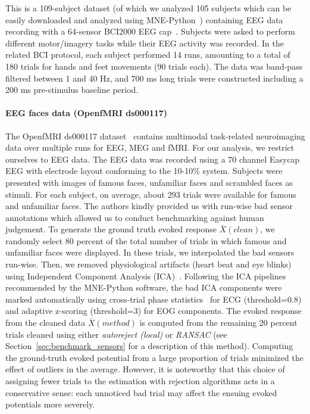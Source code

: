 This is a 109-subject dataset (of which we analyzed 105 subjects which can be easily downloaded and analyzed using MNE-Python~\citep{gramfort2013meg}) containing EEG data recording with a 64-sensor BCI2000 EEG cap~\citep{schalk2004bci2000}. Subjects were asked to perform different motor/imagery tasks while their EEG activity was recorded. In the related BCI protocol, each subject performed 14 runs, amounting to a total of 180 trials for hands and feet movements (90 trials each). The data was band-pass filtered between 1 and 40 Hz, and 700 ms long trials were constructed including a 200 ms pre-stimulus baseline period.

\paragraph{EEG faces data (OpenfMRI ds000117)}

The OpenfMRI ds000117 dataset~\citep{wakeman2015multi} contains multimodal task-related neuroimaging data over multiple runs for \ac{EEG}, \ac{MEG} and fMRI. For our analysis, we restrict ourselves to EEG data. The EEG data was recorded using a 70 channel Easycap EEG with electrode layout conforming to the 10-10\% system. Subjects were presented with images of famous faces, unfamiliar faces and scrambled faces as stimuli. For each subject, on average, about 293 trials were available for famous and unfamiliar faces. The authors kindly provided us with run-wise bad sensor annotations which allowed us to conduct benchmarking against human judgement. To generate the ground truth evoked response $\overbar{X}(clean)$, we randomly select 80 percent of the total number of trials in which famous and unfamiliar faces were displayed. In these trials, we interpolated the bad sensors run-wise. Then, we removed physiological artifacts (heart beat and eye blinks) using Independent Component Analysis (ICA)~\citep{vigario2000independent}. Following the ICA pipelines recommended by the MNE-Python software, the bad ICA components were marked automatically using cross-trial phase statistics~\citep{dammers2008integration} for ECG (threshold=0.8) and adaptive z-scoring (threshold=3) for EOG components. The evoked response from the cleaned data $\overbar{X}(method)$ is computed from the remaining 20 percent trials cleaned using either \emph{autoreject (local)} or \emph{RANSAC} (see Section~\ref{sec:benchmark_sensors} for a description of this method). Computing the ground-truth evoked potential from a large proportion of trials minimized the effect of outliers in the average. However, it is noteworthy that this choice of assigning fewer trials to the estimation with rejection algorithms acts in a conservative sense: each unnoticed bad trial may affect the ensuing evoked potentials more severely.

